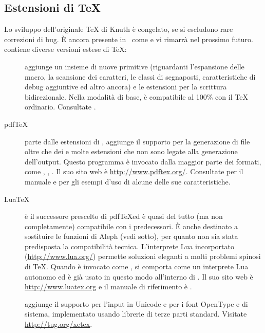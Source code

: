\documentclass{article}
\begin{document}
\subsection{Estensioni di \protect\TeX}
\label{sec:tex-extensions}

Lo sviluppo dell'originale \TeX{} di Knuth è congelato, se si escludono
rare correzioni di bug. È ancora presente in \TL\ come  e vi
rimarrà nel prossimo futuro. \TL{} contiene diverse versioni estese di
\TeX:

\begin{description}

\item [\eTeX] aggiunge un insieme di nuove primitive \label{text:etex}
(riguardanti l'espansione delle macro, la scansione dei caratteri, le
classi di segnaposti, caratteristiche di debug aggiuntive ed altro ancora)
e le estensioni \TeXXeT{} per la scrittura bidirezionale. Nella modalità
di base, \eTeX{} è compatibile al 100\% con il \TeX{} ordinario.
Consultate .

\item [pdf\TeX] parte dalle estensioni di \eTeX, aggiunge il supporto per
la generazione di file  oltre che dei \dvi{} e molte estensioni
che non sono legate alla generazione dell'output. Questo programma è
invocato dalla maggior parte dei formati, come , ,
. Il suo sito web è \url{http://www.pdftex.org/}.
Consultate  per il manuale
e  per gli
esempi d'uso di alcune delle sue caratteristiche.

\item [Lua\TeX] è il successore prescelto di pdf\TeX ed è quasi del tutto
(ma non completamente) compatibile con i predecessori. È anche destinato a
sostituire le funzioni di Aleph (vedi sotto), per quanto non sia stata
predisposta la compatibilità tecnica. L'interprete Lua incorportato
(\url{http://www.lua.org/}) permette soluzioni eleganti a molti problemi
spinosi di \TeX. Quando è invocato come , si comporta
come un interprete Lua autonomo ed è già usato in questo modo all'interno
di \TL. Il suo sito web è \url{http://www.luatex.org} e il manuale di
riferimento è .

\item [\XeTeX] aggiunge il supporto per l'input in Unicode e per i font
OpenType e di sistema, implementato usando librerie di terze parti
standard. Visitate \url{http://tug.org/xetex}.


\end{description}
\end{document}
